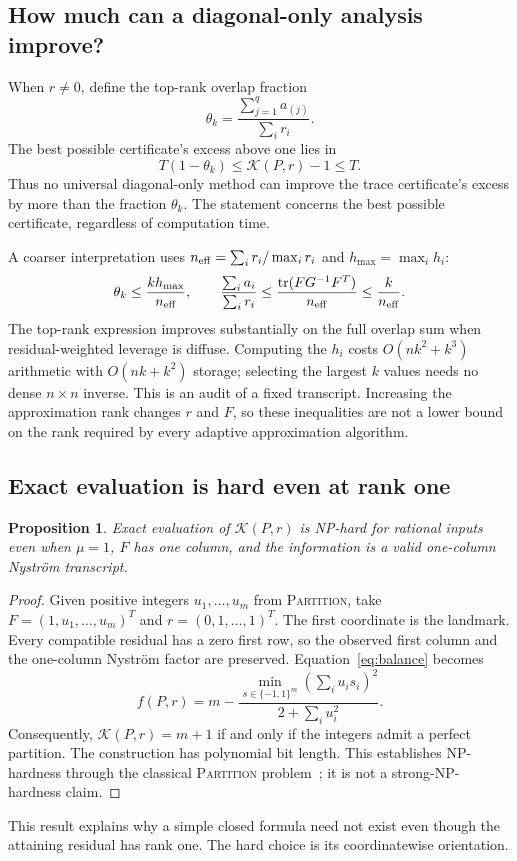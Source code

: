 \documentclass[11pt]{article}
\newtheorem{proposition}[theorem]{Proposition}
\theoremstyle{definition}\newtheorem{definition}[theorem]{Definition}
\newcommand{\tr}{\operatorname{tr}}
\newcommand{\opt}{\mathcal K}
\begin{document}
\subsection{How much can a diagonal-only analysis improve?}
When $r\ne0$, define the top-rank overlap fraction
\begin{equation}
 \theta_k=\frac{\sum_{j=1}^{q}a_{(j)}}{\sum_i r_i}.
\end{equation}
The best possible certificate's excess above one lies in
\begin{equation}\label{eq:theta}
 T(1-\theta_k)\le \opt(P,r)-1\le T.
\end{equation}
Thus no universal diagonal-only method can improve the trace certificate's excess by more than the fraction $\theta_k$. The statement concerns the best possible certificate, regardless of computation time.

A coarser interpretation uses $n_{\rm eff}=\sum_i r_i/\max_i r_i$ and $h_{\max}=\max_i h_i$:
\begin{equation}
 \theta_k\le \frac{k h_{\max}}{n_{\rm eff}},\qquad
 \frac{\sum_i a_i}{\sum_i r_i}
 \le\frac{\tr(FG^{-1}F^T)}{n_{\rm eff}}\le\frac{k}{n_{\rm eff}}.
\end{equation}
The top-rank expression improves substantially on the full overlap sum when residual-weighted leverage is diffuse. Computing the $h_i$ costs $O(nk^2+k^3)$ arithmetic with $O(nk+k^2)$ storage; selecting the largest $k$ values needs no dense $n\times n$ inverse. This is an audit of a fixed transcript. Increasing the approximation rank changes $r$ and $F$, so these inequalities are not a lower bound on the rank required by every adaptive approximation algorithm.

\subsection{Exact evaluation is hard even at rank one}
\begin{proposition}\label{prop:hard}
Exact evaluation of $\opt(P,r)$ is NP-hard for rational inputs even when $\mu=1$, $F$ has one column, and the information is a valid one-column Nystr\"om transcript.
\end{proposition}
\begin{proof}
Given positive integers $u_1,\ldots,u_m$ from \textsc{Partition}, take
$F=(1,u_1,\ldots,u_m)^T$ and $r=(0,1,\ldots,1)^T$.
The first coordinate is the landmark. Every compatible residual has a zero first row, so the observed first column and the one-column Nystr\"om factor are preserved. Equation~\eqref{eq:balance} becomes
\begin{equation}
 f(P,r)=m-\frac{\min_{s\in\{-1,1\}^m}(\sum_i u_i s_i)^2}{2+\sum_i u_i^2}.
\end{equation}
Consequently, $\opt(P,r)=m+1$ if and only if the integers admit a perfect partition. The construction has polynomial bit length. This establishes NP-hardness through the classical \textsc{Partition} problem~\cite{karp}; it is not a strong-NP-hardness claim.
\end{proof}
This result explains why a simple closed formula need not exist even though the attaining residual has rank one. The hard choice is its coordinatewise orientation.
\end{document}

